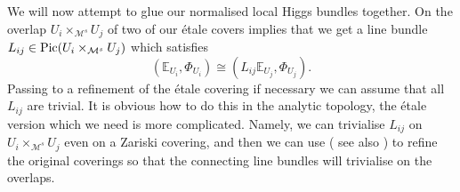 \documentclass[12pt]{article}
\numberwithin{equation}{section}
\theoremstyle{remark}
\theoremstyle{definition}
\numberwithin{theorem}{section}
\def\bE{{\mathbb{E}}}
\def\bPhi{{\mathbb{\Phi}}}
\def\M{{\mathcal{M}}}
\renewcommand{\1}{\mathbbm{1}}
\begin{document}
We will now attempt to glue our normalised local Higgs bundles together. On the overlap $U_i\times_{\M^s} U_j$  of two of our \'etale covers \cite[(4.2)]{hausel-thaddeus} implies that we get  a  line bundle $L_{ij}\in {\rm Pic}(U_i\times_{\M^s} U_j)$  which satisfies  $$(\bE_{U_i},\bPhi_{U_i})\cong (L_{ij}\bE_{U_j},\bPhi_{U_j}).$$ Passing to a refinement of the \'etale covering if necessary we can assume that all $L_{ij}$ are trivial. It is obvious how to do this in the analytic topology, the \'etale version which we need is  more complicated.   Namely, we can trivialise $L_{ij}$ on $U_i\times_{\M^s} U_j$ even on a Zariski covering, and then we can use \cite[Theorem 4.1]{artin} ( see also \cite[Lemma III.2.19]{milne}) to refine the original coverings so that the connecting line bundles will trivialise on the overlaps. 
\end{document}
